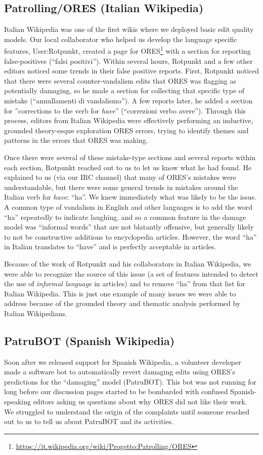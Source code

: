 \subsection{Patrolling/ORES (Italian Wikipedia)}
Italian Wikipedia was one of the first wikis where we deployed basic edit quality models.  Our local collaborator who helped us develop the language specific features, User:Rotpunkt, created a page for ORES\footnote{\url{https://it.wikipedia.org/wiki/Progetto:Patrolling/ORES}} with a section for reporting false-positives (``falsi positivi'').  Within several hours, Rotpunkt and a few other editors noticed some trends in their false positive reports.  First, Rotpunkt noticed that there were several counter-vandalism edits that ORES was flagging as potentially damaging, so he made a section for collecting that specific type of mistake (``annullamenti di vandalismo'').  A few reports later, he added a section for ''corrections to the verb for \emph{have}'' (``correzioni verbo avere'').  Through this process, editors from Italian Wikipedia were effectively performing an inductive, grounded theory-esque exploration ORES errors, trying to identify themes and patterns in the errors that ORES was making.

Once there were several of these mistake-type sections and several reports within each section, Rotpunkt reached out to us to let us know what he had found.  He explained to us (via our IRC channel) that many of ORES's mistakes were understandable, but there were some general trends in mistakes around the Italian verb for \emph{have}: ``ha''.  We knew immediately what was likely to be the issue. A common type of vandalism in English and other languages is to add the word ``ha'' repeatedly to indicate laughing, and so a common feature in the damage model was ``informal words'' that are not blatantly offensive, but generally likely to not be constructive additions to encyclopedia articles.  However, the word ``ha'' in Italian translates to ``have'' and is perfectly acceptable in articles.

Because of the work of Rotpunkt and his collaborators in Italian Wikipedia, we were able to recognize the source of this issue (a set of features intended to detect the use of \emph{informal language} in articles) and to remove ``ha'' from that list for Italian Wikipedia.  This is just one example of many issues we were able to address because of the grounded theory and thematic analysis performed by Italian Wikipedians.

\subsection{PatruBOT (Spanish Wikipedia)}
Soon after we released support for Spanish Wikipedia, a volunteer developer made a software bot to automatically revert damaging edits using ORES's predictions for the ``damaging'' model (PatruBOT).  This bot was not running for long before our discussion pages started to be bombarded with confused Spanish-speaking editors asking us questions about why ORES did not like their work.  We struggled to understand the origin of the complaints until someone reached out to us to tell us about PatruBOT and its activities.

